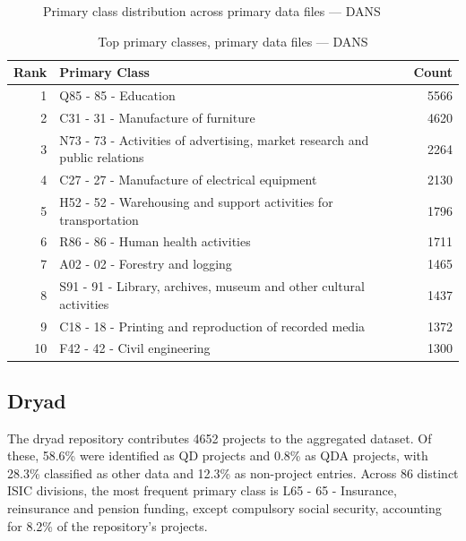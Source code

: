 \clearpage

\begin{figure}[H]
    \centering
    
    \caption{Primary class distribution across primary data files --- DANS}
\end{figure}

\begin{table}[H]
    \centering
    \begin{tabular}{r p{10cm} r}
    \hline
    \textbf{Rank} & \textbf{Primary Class} & \textbf{Count} \\
    \hline
    1 & Q85 - 85 - Education & 5566 \\
    2 & C31 - 31 - Manufacture of furniture & 4620 \\
    3 & N73 - 73 - Activities of advertising, market research and public relations & 2264 \\
    4 & C27 - 27 - Manufacture of electrical equipment & 2130 \\
    5 & H52 - 52 - Warehousing and support activities for transportation & 1796 \\
    6 & R86 - 86 - Human health activities & 1711 \\
    7 & A02 - 02 - Forestry and logging & 1465 \\
    8 & S91 - 91 - Library, archives, museum and other cultural activities & 1437 \\
    9 & C18 - 18 - Printing and reproduction of recorded media & 1372 \\
    10 & F42 - 42 - Civil engineering & 1300 \\
    \hline
    \end{tabular}
    \caption{Top primary classes, primary data files --- DANS}
\end{table}

\clearpage

\subsection{Dryad}


The dryad repository contributes 4652 projects to the aggregated dataset. Of these, 58.6\% were identified as QD projects and 0.8\% as QDA projects, with 28.3\% classified as other data and 12.3\% as non-project entries. Across 86 distinct ISIC divisions, the most frequent primary class is L65 - 65 - Insurance, reinsurance and pension funding, except compulsory social security, accounting for 8.2\% of the repository's projects.



